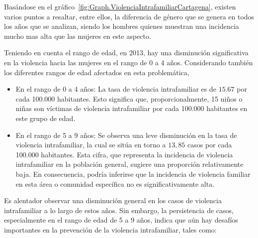 \documentclass[letterpaper, 12pt]{article}
\begin{document}
Basándose en el
gráfico~\ref{fig:Graph.ViolenciaIntrafamiliarCartagena},
existen varios puntos a resaltar, entre ellos, la
diferencia de género que se genera en todos los años que se
analizan, siendo los hombres quienes muestran una
incidencia mucho mas alta que las mujeres en este aspecto.

Teniendo en cuenta el rango de edad, en 2013, hay una
disminución significativa en la violencia hacia las mujeres
en el rango de 0 a 4 años. Considerando también los
diferentes rangos de edad afectados en esta problemática,

\begin{itemize}[label=$\diamond$]
    \item En el rango de 0 a 4 años: La tasa de violencia
          intrafamiliar es de $15.67$ por cada 100.000 habitantes.
          Esto significa que, proporcionalmente, 15 niños o niñas son
          víctimas de violencia intrafamiliar por cada 100.000
          habitantes en este grupo de edad.

    \item En el rango de 5 a 9 años: Se observa una leve disminución
          en la tasa de violencia intrafamiliar, la cual se sitúa en
          torno a $13,85$ casos por cada 100.000 habitantes. Esta
          cifra, que representa la incidencia de violencia
          intrafamiliar en la población general, sugiere una
          proporción relativamente baja. En consecuencia, podría
          inferirse que la incidencia de violencia familiar en esta
          área o comunidad específica no es significativamente alta.
\end{itemize}

Es alentador observar una disminución general en los casos
de violencia intrafamiliar a lo largo de estos años. Sin
embargo, la persistencia de casos, especialmente en el
rango de edad de 5 a 9 años, indica que aún hay desafíos
importantes en la prevención de la violencia intrafamiliar,
tales como:
\end{document}
